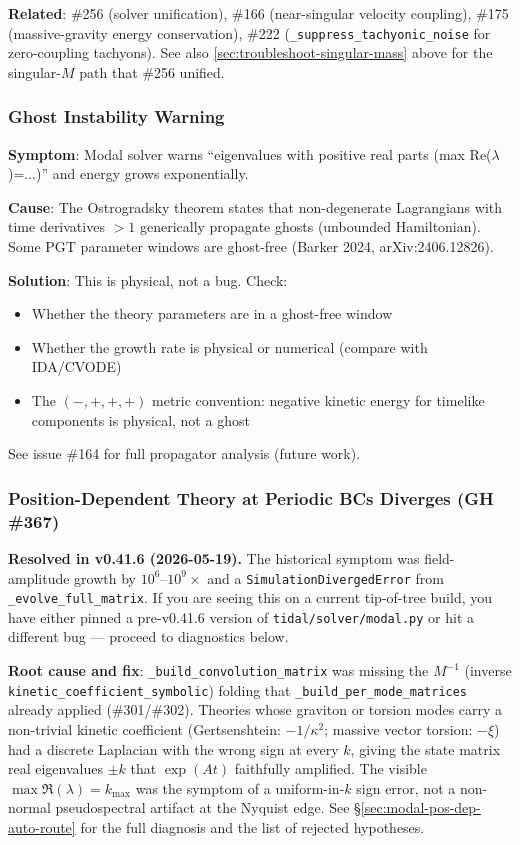 \textbf{Related}: \#256 (solver unification), \#166 (near-singular velocity coupling), \#175 (massive-gravity energy conservation), \#222 (\texttt{\_suppress\_tachyonic\_noise} for zero-coupling tachyons). See also \cref{sec:troubleshoot-singular-mass} above for the singular-$M$ path that \#256 unified.

\subsubsection{Ghost Instability Warning}
\label{sec:troubleshoot-ghost}

\textbf{Symptom}: Modal solver warns ``eigenvalues with positive real parts (max Re($\lambda$)=...)'' and energy grows exponentially.

\textbf{Cause}: The Ostrogradsky theorem states that non-degenerate Lagrangians with time derivatives $> 1$ generically propagate ghosts (unbounded Hamiltonian). Some PGT parameter windows are ghost-free (Barker 2024, arXiv:2406.12826).

\textbf{Solution}: This is physical, not a bug. Check:
\begin{itemize}
  \item Whether the theory parameters are in a ghost-free window
  \item Whether the growth rate is physical or numerical (compare with IDA/CVODE)
  \item The $(-,+,+,+)$ metric convention: negative kinetic energy for timelike components is physical, not a ghost
\end{itemize}
See issue \#164 for full propagator analysis (future work).

\subsubsection{Position-Dependent Theory at Periodic BCs Diverges (GH \#367)}

\textbf{Resolved in v0.41.6 (2026-05-19).} The historical symptom was
field-amplitude growth by $10^6$--$10^9\times$ and a
\texttt{SimulationDivergedError} from
\texttt{\_evolve\_full\_matrix}. If you are seeing this on a current
tip-of-tree build, you have either pinned a pre-v0.41.6 version of
\texttt{tidal/solver/modal.py} or hit a different bug — proceed to
diagnostics below.

\textbf{Root cause and fix}: \texttt{\_build\_convolution\_matrix}
was missing the $M^{-1}$ (inverse \texttt{kinetic\_coefficient\_symbolic})
folding that \texttt{\_build\_per\_mode\_matrices} already applied
(\#301/\#302). Theories whose graviton or torsion modes carry a
non-trivial kinetic coefficient (Gertsenshtein: $-1/\kappa^2$; massive
vector torsion: $-\xi$) had a discrete Laplacian with the wrong sign
at every $k$, giving the state matrix real eigenvalues $\pm k$ that
$\exp(A t)$ faithfully amplified. The visible $\max\Re(\lambda) =
k_{\max}$ was the symptom of a uniform-in-$k$ sign error, not a
non-normal pseudospectral artifact at the Nyquist edge. See
\S\ref{sec:modal-pos-dep-auto-route} for the full diagnosis and the
list of rejected hypotheses.

